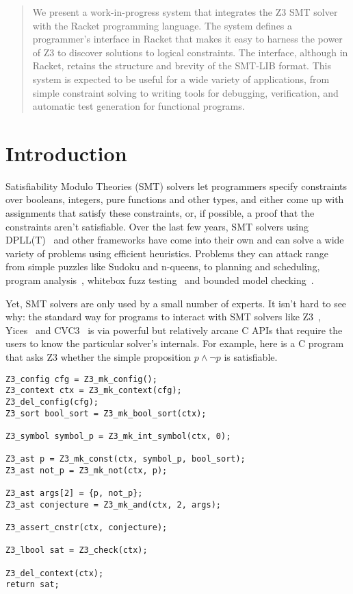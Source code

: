\begin{abstract}
 We present a work-in-progress system that integrates the Z3 SMT solver with the
 Racket programming language. The system defines a programmer's interface in
 Racket that makes it easy to harness the power of Z3 to discover solutions to
 logical constraints. The interface, although in Racket, retains the
 structure and brevity of the SMT-LIB format. This system is expected to be
 useful for a wide variety of applications, from simple constraint solving to
 writing tools for debugging, verification, and automatic test generation for
 functional programs.
\end{abstract}

\section{Introduction}
\label{sec:motiv}

Satisfiability Modulo Theories (SMT) solvers let programmers specify constraints
over booleans, integers, pure functions and other types, and either come up
with assignments that satisfy these constraints, or, if possible, a proof that
the constraints aren't satisfiable. Over the last few years, SMT solvers using
DPLL(T)~\cite{dpllt:04} and other frameworks have come into their own and can
solve a wide variety of problems using efficient heuristics. Problems they can
attack range from simple puzzles like Sudoku and n-queens, to planning and
scheduling, program analysis~\cite{Gulwani:08}, whitebox fuzz
testing~\cite{Godefroid:08} and bounded model checking~\cite{Armando:09}.

Yet, SMT solvers are only used by a small number of experts. It isn't hard to
see why: the standard way for programs to interact with SMT solvers like
Z3~\cite{z3}, Yices~\cite{yices} and CVC3~\cite{cvc3} is via powerful but
relatively arcane C APIs that require the users to know the particular solver's
internals. For example, here is a C program that asks Z3 whether the simple
proposition $p \wedge \neg p$ is satisfiable.

\begin{verbatim}
Z3_config cfg = Z3_mk_config();
Z3_context ctx = Z3_mk_context(cfg);
Z3_del_config(cfg);
Z3_sort bool_sort = Z3_mk_bool_sort(ctx);

Z3_symbol symbol_p = Z3_mk_int_symbol(ctx, 0);

Z3_ast p = Z3_mk_const(ctx, symbol_p, bool_sort);
Z3_ast not_p = Z3_mk_not(ctx, p);

Z3_ast args[2] = {p, not_p};
Z3_ast conjecture = Z3_mk_and(ctx, 2, args);

Z3_assert_cnstr(ctx, conjecture);

Z3_lbool sat = Z3_check(ctx);

Z3_del_context(ctx);
return sat;
\end{verbatim}

